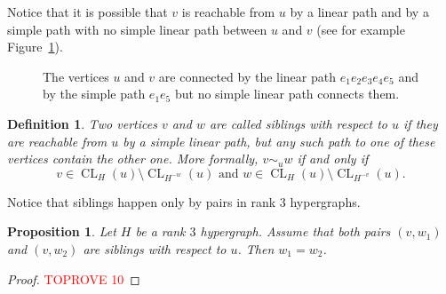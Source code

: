 \documentclass{article}
\def\rotateclockwise#1{
\newdimen\xrw
  \pgfextractx{\xrw}{#1}
  \newdimen\yrw
  \pgfextracty{\yrw}{#1}
\pgfpoint{\yrw}{-\xrw}
}
\def\rotatecounterclockwise#1{
\newdimen\xrcw
  \pgfextractx{\xrcw}{#1}
  \newdimen\yrcw
  \pgfextracty{\yrcw}{#1}
\pgfpoint{-\yrcw}{\xrcw}
}
\def\outsidespacerpgfclockwise#1#2#3{
\pgfpointscale{#3}{
    \rotateclockwise{
      \pgfpointnormalised{
        \pgfpointdiff{#1}{#2}}}}
}
\def\outsidespacerpgfcounterclockwise#1#2#3{
\pgfpointscale{#3}{
    \rotatecounterclockwise{
      \pgfpointnormalised{
        \pgfpointdiff{#1}{#2}}}}
}
\def\outsidepgfclockwise#1#2#3{
\pgfpointadd{#2}{\outsidespacerpgfclockwise{#1}{#2}{#3}}
}
\def\outsidepgfcounterclockwise#1#2#3{
\pgfpointadd{#2}{\outsidespacerpgfcounterclockwise{#1}{#2}{#3}}
}
\def\outside#1#2#3{
  ($ (#2) ! #3 ! -90 : (#1) $)
}
\def\cornerpgf#1#2#3#4{
\pgfextra{
    \pgfmathanglebetweenpoints{#2}{\outsidepgfcounterclockwise{#1}{#2}{#4}}
    \let\anglea\pgfmathresult
    \let\startangle\pgfmathresult

    \pgfmathanglebetweenpoints{#2}{\outsidepgfclockwise{#3}{#2}{#4}}
    \pgfmathparse{\pgfmathresult - \anglea}
    \pgfmathroundto{\pgfmathresult}
    \let\arcangle\pgfmathresult
    \ifthenelse{180=\arcangle \or 180<\arcangle}{
      \pgfmathparse{-360 + \arcangle}}{
      \pgfmathparse{\arcangle}}
    \let\deltaangle\pgfmathresult

    \newdimen\x
    \pgfextractx{\x}{\outsidepgfcounterclockwise{#1}{#2}{#4}}
    \newdimen\y
    \pgfextracty{\y}{\outsidepgfcounterclockwise{#1}{#2}{#4}}
  }
  -- (\x,\y) arc [start angle=\startangle, delta angle=\deltaangle, radius=#4]
}
\def\corner#1#2#3#4{
  \cornerpgf{\pgfpointanchor{#1}{center}}{\pgfpointanchor{#2}{center}}{\pgfpointanchor{#3}{center}}{#4}
}
\def\hedgeiii#1#2#3#4{
\outside{#1}{#2}{#4} \corner{#1}{#2}{#3}{#4} \corner{#2}{#3}{#1}{#4} \corner{#3}{#1}{#2}{#4} -- cycle
}
\newcommand{\hyp}{H}
\DeclareMathOperator{\CL}{CL}
\newtheorem{definition}[theorem]{Definition}
\newtheorem{proposition}[theorem]{Proposition}
\begin{document}
Notice that it is possible that \(v\) is reachable from \(u\) by a linear path and by a simple path with no simple linear path between \(u\) and \(v\) (see for example Figure~\ref{fig:linear_path}).



\begin{figure}
    \centering



    \caption{The vertices $u$ and $v$ are connected by the linear path $e_1e_2e_3e_4e_5$ and by the simple path $e_1e_5$ but no simple linear path connects them.}
    \label{fig:linear_path}
\end{figure}

 
\begin{definition}
	Two vertices \(v\) and \(w\) are called {\em siblings} with respect to \(u\) if they are reachable from \(u\) by a simple linear path, but any such path to one of these vertices contain the other one. More formally, \(v \sim_u w\) if and only if \[
		v \in \CL_H(u)\setminus \CL_{H^{-w}}(u) \text{ and }w \in \CL_H(u)\setminus \CL_{H^{-v}}(u) .
	\]
\end{definition}

Notice that siblings happen only by pairs in rank \(3\) hypergraphs.
\begin{proposition}
    Let \(\hyp\) be a rank \(3\) hypergraph.
	Assume that both pairs \((v,w_1)\) and \((v,w_2)\) are siblings with respect to \(u\). Then \(w_1=w_2\).
\end{proposition}

\begin{proof}\textcolor{red}{TOPROVE 10}\end{proof}
\end{document}

